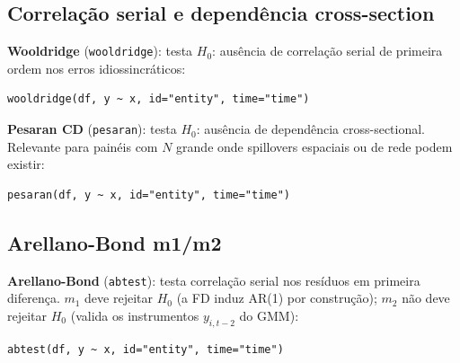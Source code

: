 \subsection{Correlação serial e dependência cross-section}

\textbf{Wooldridge} (\texttt{wooldridge}): testa $H_0$: ausência de
correlação serial de primeira ordem nos erros idiossincráticos:

\begin{lstlisting}
wooldridge(df, y ~ x, id="entity", time="time")
\end{lstlisting}

\textbf{Pesaran CD} (\texttt{pesaran}): testa $H_0$: ausência de dependência
cross-sectional. Relevante para painéis com $N$ grande onde spillovers
espaciais ou de rede podem existir:

\begin{lstlisting}
pesaran(df, y ~ x, id="entity", time="time")
\end{lstlisting}

\subsection{Arellano-Bond m1/m2}

\textbf{Arellano-Bond} (\texttt{abtest}): testa correlação serial nos
resíduos em primeira diferença. $m_1$ deve rejeitar $H_0$ (a FD induz AR(1)
por construção); $m_2$ não deve rejeitar $H_0$ (valida os instrumentos
$y_{i,t-2}$ do GMM):

\begin{lstlisting}
abtest(df, y ~ x, id="entity", time="time")
\end{lstlisting}
